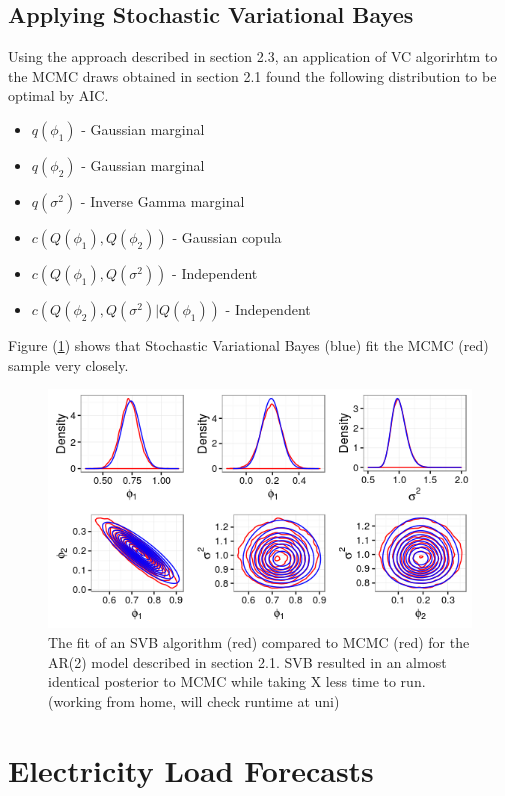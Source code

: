 \documentclass[12pt,a4paper]{article}%
\numberwithin{equation}{section}
\begin{document}
\subsection{Applying Stochastic Variational Bayes}

Using the approach described in section 2.3, an application of VC algorirhtm to the MCMC draws obtained in section 2.1 found the following distribution to be optimal by AIC.

\begin{itemize}
\item $q(\phi_1)$ - Gaussian marginal
\item $q(\phi_2)$ - Gaussian marginal
\item $q(\sigma^2)$ - Inverse Gamma marginal
\item $c(Q(\phi_1), Q(\phi_2))$ - Gaussian copula
\item $c(Q(\phi_1), Q(\sigma^2))$ - Independent
\item $c(Q(\phi_2), Q(\sigma^2) | Q(\phi_1))$ - Independent
\end{itemize}

Figure (\ref{VBfit}) shows that Stochastic Variational Bayes (blue) fit the MCMC (red) sample very closely.

\begin{figure}[h]
\label{VBfit}
\centering
\includegraphics[scale = 0.5]{VBfit.png}
\caption{The fit of an SVB algorithm (red) compared to MCMC (red) for the AR(2) model described in section 2.1. SVB resulted in an almost identical posterior to MCMC while taking X less time to run. (working from home, will check runtime at uni)}
\end{figure}

\section{Electricity Load Forecasts}
\end{document}
